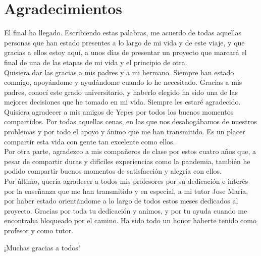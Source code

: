 \chapter*{Agradecimientos}

El final ha llegado. Escribiendo estas palabras, me acuerdo de todas aquellas personas que han estado presentes a lo largo de mi vida y de este viaje, y que gracias a ellos estoy aquí, a unos días de presentar un proyecto que marcará el final de una de las etapas de mi vida y el principio de otra.\\

Quisiera dar las gracias a mis padres y a mi hermano. Siempre han estado conmigo, apoyándome y ayudándome cuando lo he necesitado. Gracias a mis padres, conocí este grado universitario, y haberlo elegido ha sido una de las mejores decisiones que he tomado en mi vida. Siempre les estaré agradecido.\\

Quisiera agradecer a mis amigos de Yepes por todos los buenos momentos compartidos. Por todas aquellas cenas, en las que nos desahogábamos de nuestros problemas y por todo el apoyo y ánimo que me han transmitido. Es un placer compartir esta vida con gente tan excelente como ellos.\\

Por otra parte, agradezco a mis compañeros de clase por estos cuatro años que, a pesar de compartir duras y difíciles experiencias como la pandemia, también he podido compartir buenos momentos de satisfacción y alegría con ellos.\\ 

Por último, quería agradecer a todos mis profesores por su dedicación e interés por la enseñanza que me han transmitido y en especial, a mi tutor Jose María, por haber estado orientándome a lo largo de todos estos meses dedicados al proyecto. Gracias por toda tu dedicación y animos, y por tu ayuda cuando me encontraba bloqueado por el camino. Ha sido todo un honor haberte tenido como profesor y como tutor.\\

\begin{center}
	¡Muchas gracias a todos!
\end{center}